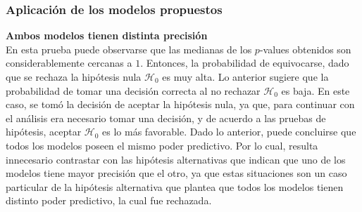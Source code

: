 \documentclass{article}
\theoremstyle{remark}
\begin{document}
\subsubsection{Aplicación de los modelos propuestos}
\textbf{Ambos modelos tienen distinta precisión}\\
En esta prueba puede observarse que las medianas de los \(p\)-values obtenidos son considerablemente cercanas a \(1\). Entonces, la probabilidad de equivocarse, dado que se rechaza la hipótesis nula \(\mathscr{H}_0\) es muy alta. Lo anterior sugiere que la probabilidad de tomar una decisión correcta al no rechazar \(\mathscr{H}_0\) es baja. En este caso, se tomó la decisión de aceptar la hipótesis nula, ya que, para continuar con el análisis era necesario tomar una decisión, y de acuerdo a las pruebas de hipótesis, aceptar \(\mathscr{H}_0\) es lo más favorable. Dado lo anterior,  puede concluirse que todos los modelos poseen el mismo poder predictivo. Por lo cual, resulta innecesario contrastar con las hipótesis alternativas que indican que uno de los modelos tiene mayor precisión que el otro, ya que estas situaciones son un caso particular de la hipótesis alternativa que plantea que todos los modelos tienen distinto poder predictivo, la cual fue rechazada.\\
\end{document}
